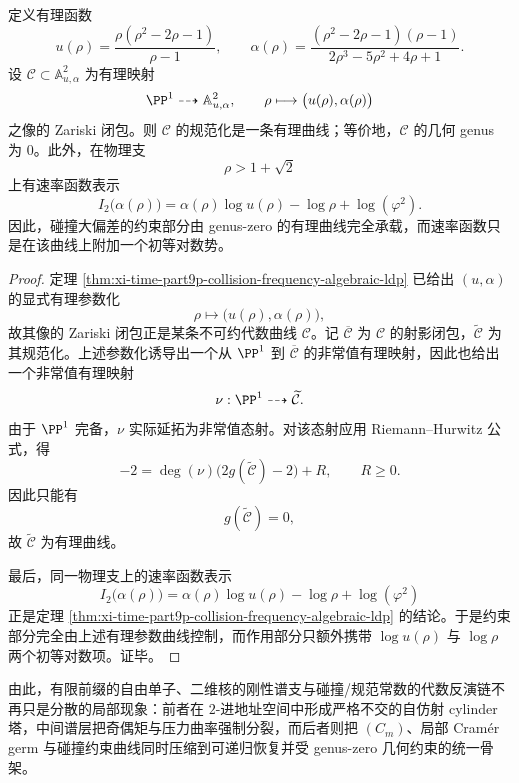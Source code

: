 \begin{theorem}[碰撞大偏差约束曲线的有理性]\label{thm:xi-time-part9xb-collision-ldp-constraint-curve-rationality}
定义有理函数
\[
u(\rho)=\frac{\rho(\rho^2-2\rho-1)}{\rho-1},
\qquad
\alpha(\rho)=\frac{(\rho^2-2\rho-1)(\rho-1)}{2\rho^3-5\rho^2+4\rho+1}.
\]
设 \(\mathcal C\subset \mathbb A^2_{u,\alpha}\) 为有理映射
\[
\PP^1\dashrightarrow \mathbb A^2_{u,\alpha},
\qquad
\rho\longmapsto \bigl(u(\rho),\alpha(\rho)\bigr)
\]
之像的 Zariski 闭包。则 \(\mathcal C\) 的规范化是一条有理曲线；等价地，\(\mathcal C\) 的几何 genus 为 \(0\)。此外，在物理支
\[
\rho>1+\sqrt2
\]
上有速率函数表示
\[
I_2\bigl(\alpha(\rho)\bigr)
=
\alpha(\rho)\log u(\rho)-\log \rho+\log(\varphi^2).
\]
因此，碰撞大偏差的约束部分由 genus-zero 的有理曲线完全承载，而速率函数只是在该曲线上附加一个初等对数势。
\end{theorem}
\begin{proof}
定理 \ref{thm:xi-time-part9p-collision-frequency-algebraic-ldp} 已给出 \((u,\alpha)\) 的显式有理参数化
\[
\rho\longmapsto \bigl(u(\rho),\alpha(\rho)\bigr),
\]
故其像的 Zariski 闭包正是某条不可约代数曲线 \(\mathcal C\)。记 \(\overline{\mathcal C}\) 为 \(\mathcal C\) 的射影闭包，\(\widetilde{\mathcal C}\) 为其规范化。上述参数化诱导出一个从 \(\PP^1\) 到 \(\overline{\mathcal C}\) 的非常值有理映射，因此也给出一个非常值有理映射
\[
\nu:\PP^1\dashrightarrow \widetilde{\mathcal C}.
\]
由于 \(\PP^1\) 完备，\(\nu\) 实际延拓为非常值态射。对该态射应用 Riemann--Hurwitz 公式，得
\[
-2=\deg(\nu)\bigl(2g(\widetilde{\mathcal C})-2\bigr)+R,
\qquad
R\ge 0.
\]
因此只能有
\[
g(\widetilde{\mathcal C})=0,
\]
故 \(\widetilde{\mathcal C}\) 为有理曲线。

最后，同一物理支上的速率函数表示
\[
I_2\bigl(\alpha(\rho)\bigr)
=
\alpha(\rho)\log u(\rho)-\log \rho+\log(\varphi^2)
\]
正是定理 \ref{thm:xi-time-part9p-collision-frequency-algebraic-ldp} 的结论。于是约束部分完全由上述有理参数曲线控制，而作用部分只额外携带 \(\log u(\rho)\) 与 \(\log\rho\) 两个初等对数项。证毕。
\end{proof}

\noindent
由此，有限前缀的自由单子、二维核的刚性谱支与碰撞/规范常数的代数反演链不再只是分散的局部现象：前者在 \(2\)-进地址空间中形成严格不交的自仿射 cylinder 塔，中间谱层把奇偶矩与压力曲率强制分裂，而后者则把 \((C_m)\)、局部 Cram\'er germ 与碰撞约束曲线同时压缩到可递归恢复并受 genus-zero 几何约束的统一骨架。

\endinput
